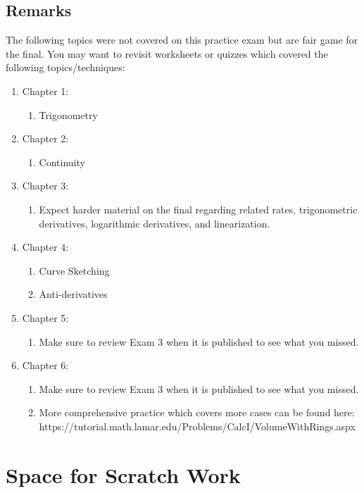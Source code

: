 \documentclass{article}
\begin{document}
\subsection*{Remarks}
The following topics were not covered on this practice exam but are fair game for the final. You may want to revisit worksheets or quizzes which covered the following topics/techniques:
\begin{enumerate}
    \item Chapter 1:
    \begin{enumerate}
        \item Trigonometry
    \end{enumerate}
    \item Chapter 2:
    \begin{enumerate}
        \item Continuity
    \end{enumerate}
    \item Chapter 3:
    \begin{enumerate}
        \item Expect harder material on the final regarding related rates, trigonometric derivatives, logarithmic derivatives, and linearization.
    \end{enumerate}
    \item Chapter 4:
    \begin{enumerate}
        \item Curve Sketching
        \item Anti-derivatives
    \end{enumerate}
    \item Chapter 5:
    \begin{enumerate}
        \item Make sure to review Exam 3 when it is published to see what you missed.
    \end{enumerate}
    \item Chapter 6:
    \begin{enumerate}
        \item Make sure to review Exam 3 when it is published to see what you missed.
        \item More comprehensive practice which covers more cases can be found here:
        \newline
        https://tutorial.math.lamar.edu/Problems/CalcI/VolumeWithRings.aspx
    \end{enumerate}
\end{enumerate}
\section*{Space for Scratch Work}
\end{document}

